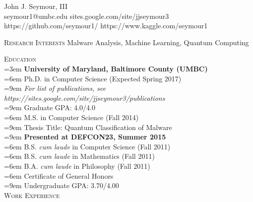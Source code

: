 \pagestyle{headings}
\newcommand{\tab}{\hspace*{3em}}
\newcommand{\atab}{\hangindent=3em \hangafter=0}
\newcommand{\btab}{\hangindent=6em \hangafter=0}
\newcommand{\ctab}{\hangindent=9em \hangafter=0}
\newcommand{\untab}{\hspace*{-3em}}

\newenvironment{my_list}
{\begin{itemize}
    \vspace{-4mm}
    \setlength{\itemsep}{0pt}
    \setlength{\itemindent}{6em}
    \setlength{\parskip}{0pt}
    \setlength{\parsep}{0pt}}
{\end{itemize}}

\oddsidemargin  -0.4in
\textwidth      7in
\topmargin  -0.5in
\headheight 0.0in
\headsep    0.0in
\textheight 11.0in


\centering
\LARGE \untab John J. Seymour, III\\
\normalsize
\medskip
seymour1@umbc.edu \tab \tab sites.google.com/site/jjseymour3\\
https://github.com/seymour1/ \tab https://www.kaggle.com/seymour1
\medskip
\hline
\bigskip

\raggedright
\textsc{Research Interests} \tab Malware Analysis, Machine Learning, Quantum Computing\\
\medskip

\textsc{Education}\\
\atab \textbf{University of Maryland, Baltimore County (UMBC)}\\
\btab Ph.D. in Computer Science (Expected Spring 2017)\\
\ctab \emph{For list of publications, see https://sites.google.com/site/jjseymour3/publications}\\
\ctab Graduate GPA: 4.0/4.0\\
\btab M.S. in Computer Science (Fall 2014)\\
\ctab Thesis Title: Quantum Classification of Malware\\
\ctab \textbf{Presented at DEFCON23, Summer 2015}\\
\btab B.S. \emph{cum laude} in Computer Science (Fall 2011)\\
\btab B.S. \emph{cum laude} in Mathematics (Fall 2011) \\
\btab B.A. \emph{cum laude} in Philosophy (Fall 2011)\\
\btab Certificate of General Honors\\
\ctab Undergraduate GPA: 3.70/4.00\\
\bigskip
\textsc{Work Experience}

